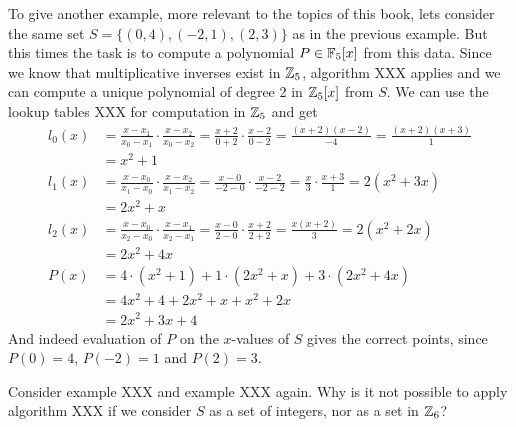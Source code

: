 \begin{example} To give another example, more relevant to the topics of this book, lets consider the same set $S=\{(0,4),(-2,1),(2,3)\}$ as in the previous example. But this times the task is to compute a polynomial $P\in\mathbb{F}_5[x]$ from this data. Since we know
that multiplicative inverses exist in $\mathbb{Z}_5$, algorithm XXX applies and we can compute a unique polynomial of degree 2 in $\mathbb{Z}_5[x]$ from $S$. We can use the lookup tables XXX for computation in $\mathbb{Z}_5$ and get
\begin{align*}
l_0(x) & = \frac{x-x_1}{x_0-x_1}\cdot\frac{x-x_2}{x_0-x_2}
         = \frac{x+2}{0+2}\cdot\frac{x-2}{0-2}
         =  \frac{(x+2)(x-2)}{-4}
         =  \frac{(x+2)(x+3)}{1}\\
       & =  x^2+1\\
l_1(x) & =  \frac{x-x_0}{x_1-x_0}\cdot\frac{x-x_2}{x_1-x_2}
         = \frac{x-0}{-2-0}\cdot \frac{x-2}{-2-2}
         = \frac{x}{3}\cdot \frac{x+3}{1}
         = 2(x^2+3x)\\
       & =  2x^2+x\\
l_2(x) & = \frac{x-x_0}{x_2-x_0}\cdot\frac{x-x_1}{x_2-x_1}
         = \frac{x-0}{2-0}\cdot\frac{x+2}{2+2}
         = \frac{x(x+2)}{3}
         = 2(x^2+2x)\\
       & = 2x^2+4x\\
P(x)   & = 4\cdot (x^2+1) + 1\cdot (2x^2+x) + 3\cdot (2x^2+4x) \\
       & = 4x^2+4 + 2x^2 +x + x^2+2x\\
       & = 2x^2 +3x +4       
\end{align*}
And indeed evaluation of $P$ on the $x$-values of $S$ gives the correct points, since $P(0)=4$, $P(-2)=1$ and $P(2)=3$.
\end{example}

\begin{exercise}
Consider example XXX and example XXX again. Why is it not possible to apply algorithm XXX if we consider $S$ as a set of integers, nor as a set in $\mathbb{Z}_6$?
\end{exercise}



